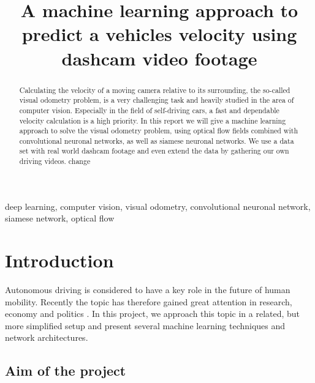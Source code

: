 \documentclass[conference]{IEEEtran}
\begin{document}
\title{A machine learning approach to predict a vehicles velocity using dashcam video footage}

\author{
\and
{}
}

\maketitle

\begin{abstract}
Calculating the velocity of a moving camera relative to its surrounding, the so-called visual odometry 
problem, is a very challenging task and heavily studied in the area of computer vision. Especially
in the field of self-driving cars, a fast and dependable velocity calculation is a high priority.
In this report we will give a machine learning approach to solve the visual odometry problem, using 
optical flow fields combined with convolutional neuronal networks, as well as siamese neuronal networks.
We use a data set with real world dashcam footage and even extend the data by gathering our own
driving videos.
change
\end{abstract}

\begin{IEEEkeywords}
deep learning, computer vision, visual odometry, convolutional neuronal network, siamese network,
optical flow
\end{IEEEkeywords}

\section{Introduction}

Autonomous driving is considered to have a key role in the future of human mobility. Recently the topic has therefore gained great attention in research, economy and politics \cite{Maurer2016}. In this project, we approach this topic in a related, but more simplified setup and present several machine learning techniques and network architectures.

\subsection{Aim of the project}
\label{subsec:AimAndMeasure}
\end{document}
